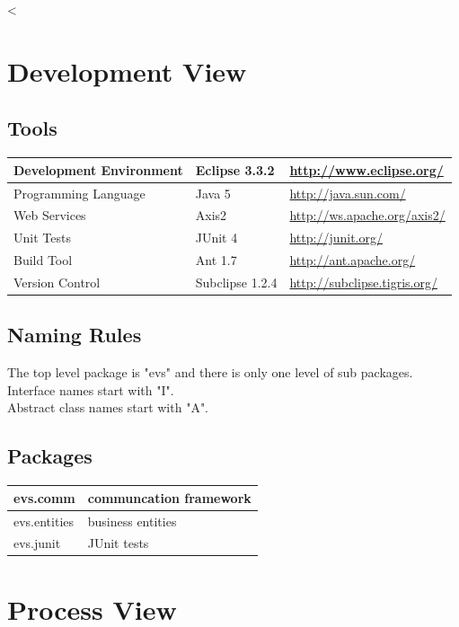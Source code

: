 <\documentclass[a4paper]{article}
\begin{document}
\newpage


\section{Development View}

\subsection{Tools}

	\begin{tabular}{|l|l|l|}
	\hline
	Development Environment & Eclipse 3.3.2 & \url{http://www.eclipse.org/}\\
	\hline
	Programming Language & Java 5 & \url{http://java.sun.com/}\\
	\hline
	Web Services & Axis2 & \url{http://ws.apache.org/axis2/}\\
	\hline
	Unit Tests & JUnit 4 & \url{http://junit.org/}\\
	\hline
	Build Tool & Ant 1.7 & \url{http://ant.apache.org/}\\
	\hline
	Version Control & Subclipse 1.2.4 & \url{http://subclipse.tigris.org/}\\
	\hline
	\end{tabular}

\subsection{Naming Rules}

The top level package is "evs" and there is only one level of sub packages.\\
Interface names start with "I".\\
Abstract class names start with "A".\\

\subsection{Packages}

	\begin{tabular}{|l|l|}
	\hline
	evs.comm & communcation framework\\
	\hline
	evs.entities & business entities\\
	\hline
	evs.junit & JUnit tests\\
	\hline
	\end{tabular}

\section{Process View}
\end{document}
